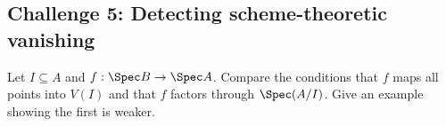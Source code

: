 \subsection*{Challenge 5: Detecting scheme-theoretic vanishing}
\begin{problem}\label{chal:vi22-05}
Let $I\subseteq A$ and $f:\Spec B\to\Spec A$.  Compare the conditions that $f$ maps all points into $V(I)$ and that $f$ factors through $\Spec(A/I)$.  Give an example showing the first is weaker.
\end{problem}
